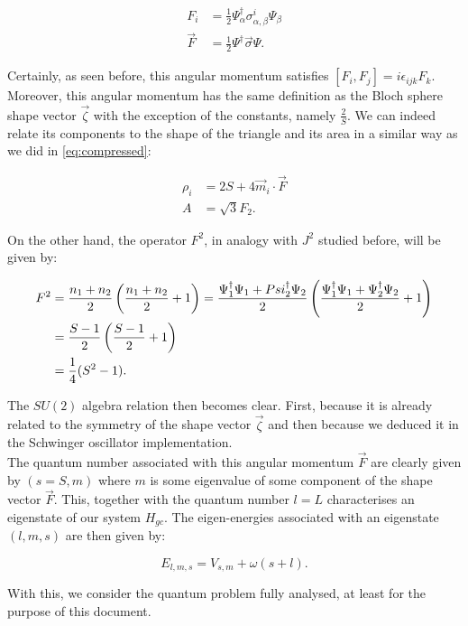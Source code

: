 \begin{align*}
F_i  &= \frac{1}{2}\Psi_\alpha^\dagger \sigma^i_{\alpha,\beta}\Psi_\beta\\
\vec{F} &= \frac{1}{2}\Psi^\dagger \vec{\sigma}\Psi.
\end{align*}

Certainly, as seen before, this angular momentum satisfies $[F_i,F_j] = i\epsilon_{ijk}F_k$. Moreover, this angular momentum has the same definition as the Bloch sphere shape vector $\vec{\zeta}$ with the exception of the constants, namely $\frac{2}{S}$. We can indeed relate its components to the shape of the triangle and its area in a similar way as we did in \eqref{eq:compressed}:

\begin{align*}
\rho_i &= 2S+4\vec{m}_i\cdot\vec{F}\\
A &= \sqrt{3}F_2.
\end{align*}

On the other hand, the operator $F^2$, in analogy with $J^2$ studied before, will be given by: 

\begin{align*}
F^2 &= \frac{n_1+n_2}{2}\left( \frac{n_1+n_2}{2}+1 \right) = \frac{\Psi_1^\dagger \Psi_1 + Psi_2^\dagger \Psi_2}{2}\left( \frac{\Psi_1^\dagger \Psi_1 + \Psi_2^\dagger \Psi_2}{2}+1 \right)\\
&= \frac{S-1}{2}\left( \frac{S-1}{2}+1 \right)\\
&= \frac{1}{4}(S^2-1).
\end{align*}

The $SU(2)$ algebra relation then becomes clear. First, because it is already related to the symmetry of the shape vector $\vec{\zeta}$ and then because we deduced it in the Schwinger oscillator implementation.\\

The quantum number associated with this angular momentum $\vec{F}$ are clearly given by $(s= S,m)$ where $m$ is some eigenvalue of some component of the shape vector $\vec{F}$. This, together with the quantum number $l=L$ characterises an eigenstate of our system $H_{gc}$. The eigen-energies associated with an eigenstate $(l,m,s)$ are then given by:

\begin{equation*}
E_{l,m,s} = V_{s,m} + \omega(s+l).
\end{equation*}

With this, we consider the quantum problem fully analysed, at least for the purpose of this document.
















